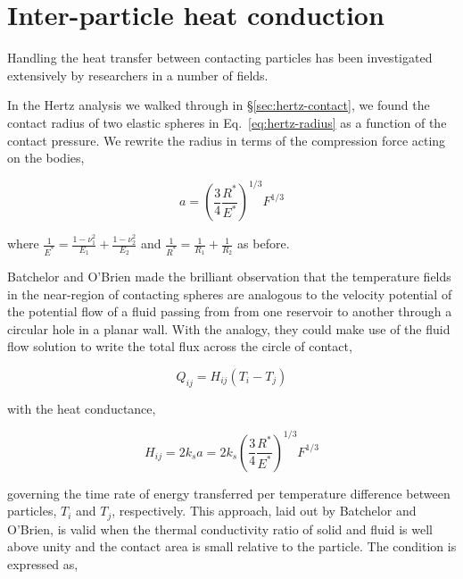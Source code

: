 \section{Inter-particle heat conduction}\label{sec:ht-pebble-conduction}

Handling the heat transfer between contacting particles has been investigated extensively by researchers in a number of fields\cite{Zhou2009,Zhang2011,Wu2011,Vargas2001,Li2000,Chaudhuri2006}.

In the Hertz analysis we walked through in \S\ref{sec:hertz-contact}, we found the contact radius of two elastic spheres in Eq.~\ref{eq:hertz-radius} as a function of the contact pressure. We rewrite the radius in terms of the compression force acting on the bodies,

\begin{equation}
	a =  \left(\frac{3}{4}\frac{R^*}{E^*}\right)^{1/3}F^{1/3}	
\end{equation}

where $\frac{1}{E^*} = \frac{1-\nu_1^2}{E_1} + \frac{1-\nu_2^2}{E_2}$ and $\frac{1}{R^*} = \frac{1}{R_1} + \frac{1}{R_2}$ as before.

Batchelor and O'Brien\cite{Batchelor1977} made the brilliant observation that the temperature fields in the near-region of contacting spheres are analogous to the velocity potential of the potential flow of a fluid passing from from one reservoir to another through a circular hole in a planar wall. With the analogy, they could make use of the fluid flow solution to write the total flux across the circle of contact,

\begin{equation}\label{eq:pebble-conduction-heat-transfer}
	Q_{ij} = H_{ij}(T_i - T_j)
\end{equation}

with the heat conductance, 

\begin{equation}\label{eq:batchelor-pebble-conductance}
	H_{ij} = 2k_sa = 2k_s \left(\frac{3}{4}\frac{R^*}{E^*}\right)^{1/3}F^{1/3}
\end{equation}

governing the time rate of energy transferred per temperature difference between particles, $T_i$ and $T_j$, respectively. This approach, laid out by Batchelor and O'Brien, is valid when the thermal conductivity ratio of solid and fluid is well above unity and the contact area is small relative to the particle. The condition is expressed as,

